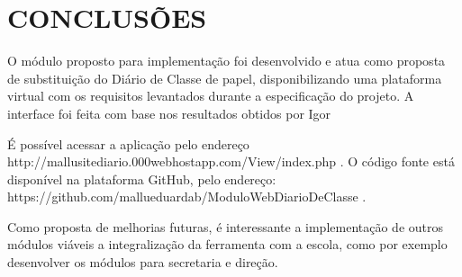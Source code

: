 \chapter{CONCLUSÕES}
\label{cap:conclusao}


O módulo proposto para implementação foi desenvolvido e atua como proposta de substituição do Diário de Classe de papel, disponibilizando uma plataforma virtual com os requisitos levantados durante a especificação do projeto.
A interface foi feita com base nos resultados obtidos por Igor


 É possível acessar a aplicação pelo endereço http://mallusitediario.000webhostapp.com/View/index.php . O código fonte está disponível na plataforma GitHub, pelo endereço:  https://github.com/mallueduardab/ModuloWebDiarioDeClasse .




Como proposta de melhorias futuras, é interessante a implementação de outros módulos viáveis a integralização da ferramenta com a escola, como por exemplo desenvolver os módulos para secretaria e direção.